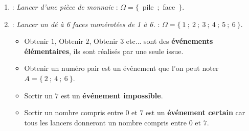 \begin{exemples*1}
   \begin{enumerate}
      \item {} : {\it \og Lancer d'une pièce de monnaie\fg{}} : $\Omega =\{$~pile~;~face~$\}$.
      \item {} : \textit{\og Lancer un dé à 6 faces numérotées de 1 à 6.\fg{}} : $\Omega =\{~1~;~2~;~3~;~4~;~5~;~6~\}$.
      \begin{itemize}
        \item \og Obtenir $1$\fg{}, \og Obtenir $2$\fg{}, \og Obtenir $3$\fg{} etc... sont des \textbf{événements élémentaires}, ils sont réalisés par une seule issue.
        \item \og Obtenir un numéro pair \fg{} est un événement que l'on peut noter $A=\{~2~;~4~;~6~\}$.
        \item \og Sortir un $7$\fg{} est un \textbf{événement impossible}.
        \item \og Sortir un nombre compris entre $0$ et $7$\fg{} est un \textbf{événement certain} car tous les lancers donneront un nombre compris entre $0$ et $7$.
      \end{itemize}
   \end{enumerate}
\end{exemples*1}
